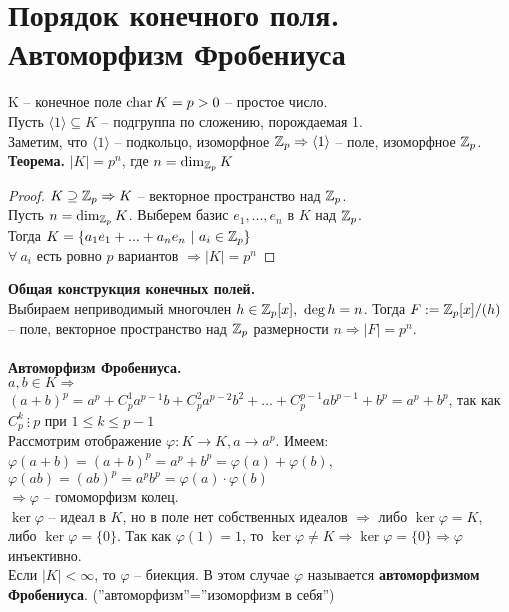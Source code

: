 \section{Порядок конечного поля. Автоморфизм Фробениуса}

K -- конечное поле $\operatorname{char}{K}=p>0$ -- простое число.\\
Пусть $\langle 1\rangle \subseteq K$ -- подгруппа по сложению, порождаемая 1.\\
Заметим, что $\langle 1\rangle$ -- подкольцо, изоморфное $\mathbb{Z}_p\Rightarrow \langle 1\rangle$ -- поле, изоморфное $\mathbb{Z}_p$.\\
\textbf{Теорема.} $|K|=p^n$, где $n=\dim_{\mathbb{Z}_p}K$
\begin{proof}
    $K\supseteq \mathbb{Z}_p\Rightarrow K$ -- векторное пространство над $\mathbb{Z}_p$.\\
    Пусть $n=\dim_{\mathbb{Z}_p}K$. Выберем базис $e_1,...,e_n$ в $K$ над $\mathbb{Z}_p$.\\
    Тогда $K=\{ a_1e_1+...+a_ne_n \ | \ a_i\in \mathbb{Z}_p\}$\\
    $\forall \ a_i$ есть ровно $p$ вариантов $\Rightarrow |K|=p^n$
\end{proof}
\noindent \textbf{Общая конструкция конечных полей.}\\
Выбираем неприводимый многочлен $h\in \mathbb{Z}_p[x], \ \deg{h}=n$. Тогда $F:=\mathbb{Z}_p[x]/(h)$ -- поле, векторное пространство над $\mathbb{Z}_p$ размерности $n\Rightarrow |F|=p^n$.\\\\
\textbf{Автоморфизм Фробениуса.}\\
$a,b\in K\Rightarrow $\\
$(a+b)^p=a^p+C_p^1a^{p-1}b+C_p^2a^{p-2}b^2+...+C_p^{p-1}ab^{p-1}+b^p=a^p+b^p$, так как $C_p^k\ \vdots\ p$ при $1\leqslant k\leqslant p-1$\\
Рассмотрим отображение $\varphi: K\to K, a\to a^p$. Имеем:\\
$\varphi(a+b)=(a+b)^p=a^p+b^p=\varphi(a)+\varphi(b)$,\\
$\varphi(ab)=(ab)^p=a^pb^p=\varphi(a)\cdot\varphi(b)$\\
$\Rightarrow \varphi$ -- гомоморфизм колец.\\
$\ker\varphi$ -- идеал в $K$, но в поле нет собственных идеалов $\Rightarrow $ либо $\ker\varphi=K$, либо $\ker\varphi=\{0\}$. Так как $\varphi(1)=1$, то $\ker\varphi\neq K\Rightarrow \ker\varphi=\{0\}\Rightarrow\varphi$ инъективно.\\
Если $|K|<\infty$, то $\varphi$ -- биекция. В этом случае $\varphi$ называется \textbf{автоморфизмом Фробениуса}. (''автоморфизм''=''изоморфизм в себя'')
